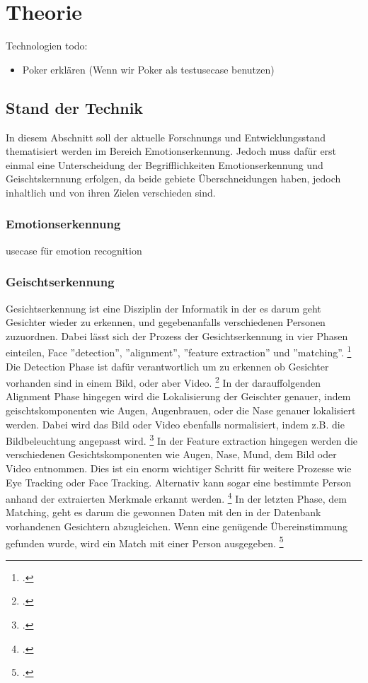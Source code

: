 \documentclass[12pt, a4paper]{scrbook}
\begin{document}
\let\cleardoublepage\relax
\chapter{Theorie}
Technologien todo:
\begin{itemize}

\item Poker erklären (Wenn wir Poker als testusecase benutzen)
\end{itemize}

\section{Stand der Technik}
In diesem Abschnitt soll der aktuelle Forschnungs und Entwicklungsstand thematisiert werden im Bereich Emotionserkennung. Jedoch muss dafür erst einmal eine Unterscheidung der Begrifflichkeiten Emotionserkennung und Geischtskernnung erfolgen, da beide gebiete Überschneidungen haben, jedoch inhaltlich und von ihren Zielen verschieden sind.
\subsection{Emotionserkennung}

usecase für emotion recognition

\subsection{Geischtserkennung}
Gesichtserkennung ist eine Disziplin der Informatik in der es darum geht Gesichter wieder zu erkennen, und gegebenanfalls verschiedenen Personen zuzuordnen. Dabei lässt sich der Prozess der Gesichtserkennung in vier Phasen einteilen, Face ''detection'', ''alignment'', ''feature extraction'' und ''matching''.
\footcite[Vgl. ][2]{HandbookFaceRec}
Die Detection Phase ist dafür verantwortlich um zu erkennen ob Gesichter vorhanden sind in einem Bild, oder aber Video.
\footcite[Vgl. ][2]{HandbookFaceRec}
 In der darauffolgenden Alignment Phase hingegen wird die Lokalisierung der Geischter genauer, indem geischtskomponenten wie Augen, Augenbrauen, oder die Nase genauer lokalisiert werden. Dabei wird das Bild oder Video ebenfalls  normalisiert, indem z.B. die Bildbeleuchtung angepasst wird.
 \footcite[Vgl. ][2]{HandbookFaceRec}
 In der Feature extraction hingegen werden die verschiedenen Gesichtskomponenten wie Augen, Nase, Mund, dem Bild oder Video entnommen. Dies ist ein enorm wichtiger Schritt für weitere Prozesse wie Eye Tracking oder Face Tracking. Alternativ kann sogar eine bestimmte Person anhand der extraierten Merkmale erkannt werden.
\footcite[Vgl. ][Abstract]{IEEE}
 In der letzten Phase, dem Matching, geht es darum die gewonnen Daten mit den in der Datenbank vorhandenen Gesichtern abzugleichen. Wenn eine genügende Übereinstimmung gefunden wurde, wird ein Match mit einer Person ausgegeben.
  \footcite[Vgl. ][3]{HandbookFaceRec}
 
\end{document}
